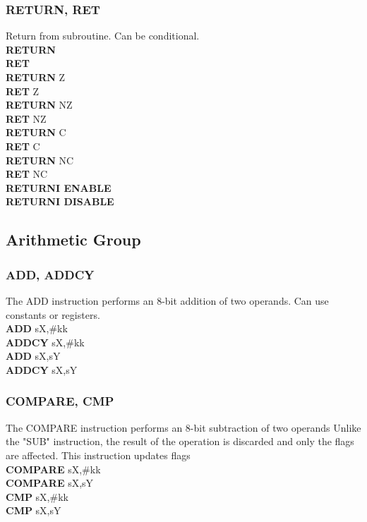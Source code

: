         \subsubsection{RETURN, RET}
            Return from subroutine. Can be conditional.\\
            \textbf{RETURN}\\
            \textbf{RET}\\
            \textbf{RETURN} Z\\
            \textbf{RET} Z\\
            \textbf{RETURN} NZ\\
            \textbf{RET} NZ\\
            \textbf{RETURN} C\\
            \textbf{RET} C\\
            \textbf{RETURN} NC\\
            \textbf{RET} NC\\
            \textbf{RETURNI ENABLE}\\
            \textbf{RETURNI DISABLE}\\

    \subsection{Arithmetic Group}
        \subsubsection{ADD, ADDCY}
            The ADD instruction performs an 8-bit addition of two operands. Can use constants or registers.\\
            \textbf{ADD} sX,\#kk\\
            \textbf{ADDCY} sX,\#kk\\
            \textbf{ADD} sX,sY\\
            \textbf{ADDCY} sX,sY\\

        \subsubsection{COMPARE, CMP}
            The COMPARE instruction performs an 8-bit subtraction of two operands Unlike the "SUB" instruction, the result of the operation is discarded and only the flags are affected. This instruction updates flags\\
            \textbf{COMPARE} sX,\#kk\\
            \textbf{COMPARE} sX,sY\\
            \textbf{CMP}     sX,\#kk\\
            \textbf{CMP}     sX,sY\\

